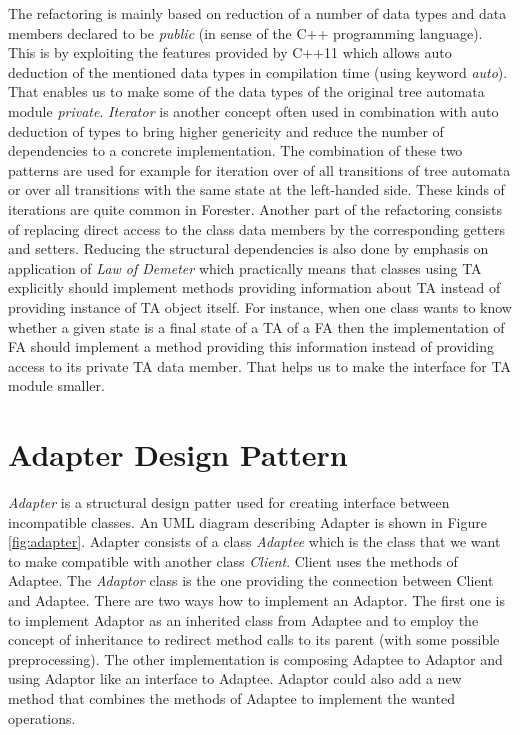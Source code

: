 The refactoring is mainly based on reduction of a number of data types and data members declared
to be \emph{public} (in sense of the C++ programming language).
This is by exploiting the features provided by C++11 \cite{stroustrup13}
which allows auto deduction of the mentioned data types in compilation time (using keyword \emph{auto}).
That enables us to make some of the data types of the original tree automata module \emph{private}.
\emph{Iterator} is another concept often used in combination with auto deduction of types
to bring higher genericity and reduce the number of dependencies to a concrete implementation.
The combination of these two patterns are used for example for
iteration over of all transitions of tree automata or over all transitions with
the same state at the left-handed side.
These kinds of iterations are quite common in Forester.
Another part of the refactoring consists of replacing direct access to
the class data members by the corresponding getters and setters.
Reducing the structural dependencies is also done by emphasis on application of \emph{Law of Demeter} \cite{lod89} which practically
means that classes using TA explicitly should implement methods providing information about
TA instead of providing instance of TA object itself.
For instance, when one class wants to know whether a given state is a final state
of a TA of a FA then the implementation of FA should
implement a method providing this information instead of
providing access to its private TA data member.
That helps us to make the interface for TA module smaller.

\section{Adapter Design Pattern}
\label{sec:adapter}

\emph{Adapter} is a structural design patter \cite{gamma95} used for creating interface between incompatible classes.
An UML diagram describing Adapter is shown in Figure \ref{fig:adapter}.
Adapter consists of a class \emph{Adaptee} which is the class that we want to make compatible with
another class \emph{Client}.
Client uses the methods of Adaptee.
The \emph{Adaptor} class is the one providing the connection between Client and Adaptee.
There are two ways how to implement an Adaptor.
The first one is to implement Adaptor as an inherited class from Adaptee
and to employ the concept of inheritance to redirect
method calls to its parent (with some possible preprocessing).
The other implementation is composing Adaptee to Adaptor and using Adaptor like an interface to Adaptee.
Adaptor could also add a new method that combines
the methods of Adaptee to implement the wanted operations.

